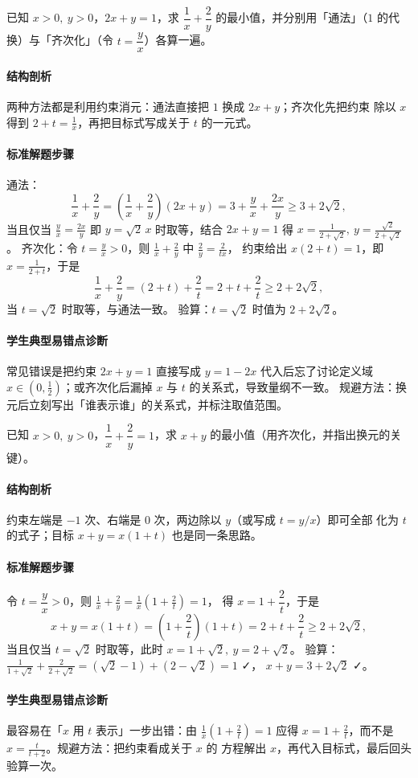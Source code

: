 \begin{problem}
已知 $x>0,\ y>0$，$2x+y=1$，求 $\dfrac1x+\dfrac2y$ 的最小值，并分别用「通法」（$1$ 的代换）与「齐次化」（令 $t=\dfrac yx$）各算一遍。
\end{problem}
\begin{solution}
\paragraph{结构剖析}
两种方法都是利用约束消元：通法直接把 $1$ 换成 $2x+y$；齐次化先把约束
除以 $x$ 得到 $2+t=\frac1x$，再把目标式写成关于 $t$ 的一元式。
\paragraph{标准解题步骤}
通法：
\[
  \frac1x+\frac2y=\left(\frac1x+\frac2y\right)(2x+y)
  =3+\frac{y}{x}+\frac{2x}{y}\ge3+2\sqrt2,
\]
当且仅当 $\frac yx=\frac{2x}{y}$ 即 $y=\sqrt2\,x$ 时取等，结合 $2x+y=1$
得 $x=\frac1{2+\sqrt2},\ y=\frac{\sqrt2}{2+\sqrt2}$。
齐次化：令 $t=\frac yx>0$，则 $\frac1x+\frac2y$ 中 $\frac{2}{y}=\frac{2}{tx}$，
约束给出 $x(2+t)=1$，即 $x=\frac1{2+t}$，于是
\[
  \frac1x+\frac2y=(2+t)+\frac{2}{t}=2+t+\frac2t\ge2+2\sqrt2,
\]
当 $t=\sqrt2$ 时取等，与通法一致。
验算：$t=\sqrt2$ 时值为 $2+2\sqrt2$。
\paragraph{学生典型易错点诊断}
常见错误是把约束 $2x+y=1$ 直接写成 $y=1-2x$ 代入后忘了讨论定义域
$x\in(0,\tfrac12)$；或齐次化后漏掉 $x$ 与 $t$ 的关系式，导致量纲不一致。
规避方法：换元后立刻写出「谁表示谁」的关系式，并标注取值范围。
\end{solution}

\begin{problem}
已知 $x>0,\ y>0$，$\dfrac1x+\dfrac2y=1$，求 $x+y$ 的最小值（用齐次化，并指出换元的关键）。
\end{problem}
\begin{solution}
\paragraph{结构剖析}
约束左端是 $-1$ 次、右端是 $0$ 次，两边除以 $y$（或写成 $t=y/x$）即可全部
化为 $t$ 的式子；目标 $x+y=x(1+t)$ 也是同一条思路。
\paragraph{标准解题步骤}
令 $t=\dfrac yx>0$，则 $\frac1x+\frac2y=\frac1x\left(1+\frac2t\right)=1$，
得 $x=1+\dfrac2t$，于是
\[
  x+y=x(1+t)=\left(1+\frac2t\right)(1+t)
  =2+t+\frac2t\ge2+2\sqrt2,
\]
当且仅当 $t=\sqrt2$ 时取等，此时 $x=1+\sqrt2,\ y=2+\sqrt2$。
验算：$\frac1{1+\sqrt2}+\frac2{2+\sqrt2}=(\sqrt2-1)+(2-\sqrt2)=1$ ✓，
$x+y=3+2\sqrt2$ ✓。
\paragraph{学生典型易错点诊断}
最容易在「$x$ 用 $t$ 表示」一步出错：由 $\frac1x(1+\frac2t)=1$ 应得
$x=1+\frac2t$，而不是 $x=\frac{t}{t+2}$。规避方法：把约束看成关于 $x$ 的
方程解出 $x$，再代入目标式，最后回头验算一次。
\end{solution}

